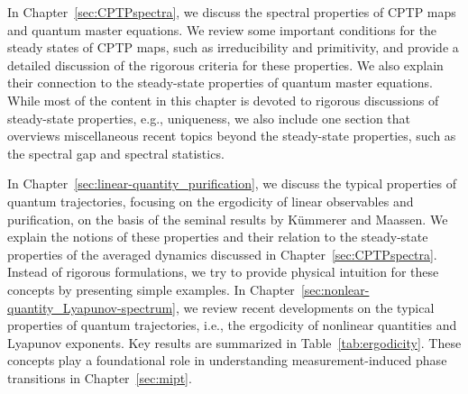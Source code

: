 \documentclass[preprint,pteplogo]{ptephy_v2}%
\numberwithin{equation}{section}
\theoremstyle{definition}
\begin{document}
In Chapter~\ref{sec:CPTPspectra}, we discuss the spectral properties of CPTP maps and quantum master equations.
We review some important conditions for the steady states of CPTP maps, such as irreducibility and primitivity, and provide a detailed discussion of the rigorous criteria for these properties.
We also explain their connection to the steady-state properties of quantum master equations.
While most of the content in this chapter is devoted to rigorous discussions of steady-state properties, e.g., uniqueness, we also include one section that overviews miscellaneous recent topics beyond the steady-state properties, such as the spectral gap and spectral statistics.

In Chapter~\ref{sec:linear-quantity_purification}, we discuss the typical properties of quantum trajectories, focusing on the ergodicity of linear observables and purification, on the basis of the seminal results by K\"ummerer and Maassen. 
We explain the notions of these properties and their relation to the steady-state properties of the averaged dynamics discussed in Chapter~\ref{sec:CPTPspectra}.
Instead of rigorous formulations, we try to provide physical intuition for these concepts by presenting simple examples.
In Chapter~\ref{sec:nonlear-quantity_Lyapunov-spectrum}, we review recent developments on the typical properties of quantum trajectories, i.e., the ergodicity of nonlinear quantities and Lyapunov exponents.
Key results are summarized in Table~\ref{tab:ergodicity}.
These concepts play a foundational role in understanding measurement-induced phase transitions in Chapter~\ref{sec:mipt}.
\end{document}

